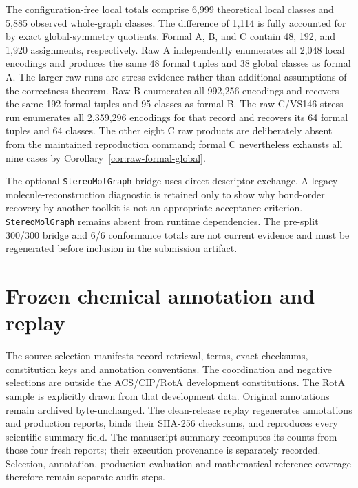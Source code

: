 \documentclass[pdflatex,sn-mathphys-num,referee,lineno]{sn-jnl}
\newcommand{\stereomolgraph}{\texttt{StereoMolGraph}\xspace}
\theoremstyle{plain}
\theoremstyle{remark}
\theoremstyle{definition}
\begin{document}
The configuration-free local totals comprise 6,999 theoretical local classes
and 5,885 observed whole-graph classes.  The difference of 1,114 is fully
accounted for by exact global-symmetry quotients.  Formal A, B, and C contain
48, 192, and 1,920 assignments, respectively.  Raw A independently enumerates
all 2,048 local encodings and produces the same 48 formal tuples and 38 global
classes as formal A.  The larger raw runs are stress evidence rather than
additional assumptions of the correctness theorem.  Raw B enumerates all
992,256 encodings and recovers
the same 192 formal tuples and 95 classes as formal B.  The raw C/VS146 stress
run enumerates all 2,359,296 encodings for that record and recovers its 64
formal tuples and 64 classes.  The other eight C raw products are deliberately
absent from the maintained reproduction command; formal C nevertheless
exhausts all nine cases by Corollary~\ref{cor:raw-formal-global}.

The optional \stereomolgraph bridge uses direct descriptor exchange.  A legacy
molecule-reconstruction diagnostic is retained only to show why bond-order
recovery by another toolkit is not an appropriate acceptance criterion.
\stereomolgraph remains absent from runtime dependencies.  The pre-split
300/300 bridge and 6/6 conformance totals are not current evidence and must be
regenerated before inclusion in the submission artifact.

\section{Frozen chemical annotation and replay}
\label{sec:chemical-annotation}

The source-selection manifests record retrieval, terms, exact checksums,
constitution keys and annotation conventions. The coordination and negative
selections are outside the ACS/CIP/RotA development constitutions. The RotA
sample is explicitly drawn from that development data. Original annotations
remain archived byte-unchanged. The clean-release replay regenerates annotations
and production reports, binds their SHA-256 checksums, and reproduces every
scientific summary field. The manuscript summary recomputes its counts from
those four fresh reports; their execution provenance is separately recorded.
Selection, annotation, production evaluation and mathematical reference
coverage therefore remain separate audit steps.
\end{document}
